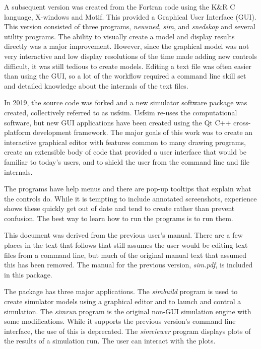 \documentclass[12pt,openany,oneside]{book}
\newcommand{\prog}[1]{\textit{{#1}}}
\begin{document}
A subsequent version was created from the Fortran code using the K\&R C
language, X-windows and Motif. This provided a Graphical User Interface
(GUI). This version consisted of three programs, \prog{newsned},
\prog{sim}, and \prog{snedskop} and several utility programs.  The ability
to visually create a model and display results directly was a major
improvement. However, since the graphical model was not very interactive
and low display resolutions of the time made adding new controls
difficult, it was still tedious to create models. Editing a text file was
often easier than using the GUI, so a lot of the workflow required a
command line skill set and detailed knowledge about the internals of the
text files.

In 2019, the source code was forked and a new simulator software package
was created, collectively referred to as usfsim. Usfsim re-uses the
computational software, but new GUI applications have been created using
the Qt C++ cross-platform development framework. The major goals of this
work was to create an interactive graphical editor with features common to
many drawing programs, create an extensible body of code that provided a
user interface that would be familiar to today's users, and to shield the
user from the command line and file internals.

The programs have help menus and there are pop-up tooltips that explain
what the controls do. While it is tempting to include annotated
screenshots, experience shows these quickly get out of date and tend to
create rather than prevent confusion. The best way to learn how to run the
programs is to run them.

This document was derived from the previous user's manual. There are a few
places in the text that follows that still assumes the user would be
editing text files from a command line, but much of the original manual
text that assumed this has been removed. The manual for the previous
version, \prog {sim.pdf}, is included in this package.

The package has three major applications. The \prog{simbuild}
 program is used to create simulator
models using a
graphical editor and to launch and control a simulation. The
\prog{simrun}  program is the original non-GUI simulation
engine with some modifications. While it supports the previous version's
command line interface, the use of this is deprecated. The
\prog{simviewer}  program displays plots of the results
of a simulation run. The user can interact with the plots.
\end{document}
